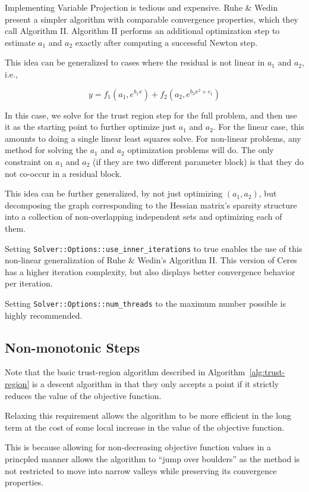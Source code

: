Implementing Variable Projection is tedious and expensive. Ruhe \&
Wedin present a simpler algorithm with comparable convergence
properties, which they call Algorithm II.  Algorithm II performs an
additional optimization step to estimate $a_1$ and $a_2$ exactly after
computing a successful Newton step.


This idea can be generalized to cases where the residual is not
linear in $a_1$ and $a_2$, i.e.,

\begin{equation}
  y = f_1(a_1, e^{b_1 x}) + f_2(a_2, e^{b_3 x^2 + c_1})
\end{equation}

In this case, we solve for the trust region step for the full problem,
and then use it as the starting point to further optimize just $a_1$
and $a_2$. For the linear case, this amounts to doing a single linear
least squares solve. For non-linear problems, any method for solving
the $a_1$ and $a_2$ optimization problems will do. The only constraint
on $a_1$ and $a_2$ (if they are two different parameter block) is that
they do not co-occur in a residual block.

This idea can be further generalized, by not just optimizing $(a_1,
a_2)$, but decomposing the graph corresponding to the Hessian matrix's
sparsity structure into a collection of non-overlapping independent sets
and optimizing each of them.

Setting \texttt{Solver::Options::use\_inner\_iterations} to true
enables
the use of this non-linear generalization of Ruhe \& Wedin's Algorithm
II.  This version of Ceres has a higher iteration complexity, but also
displays better convergence behavior per iteration.

Setting \texttt{Solver::Options::num\_threads} to the maximum number
possible is highly recommended.

\subsection{Non-monotonic Steps}
\label{sec:non-monotonic}
Note that the basic trust-region algorithm described in
Algorithm~\ref{alg:trust-region} is a descent algorithm  in that they
only accepts a point if it strictly reduces the value of the objective
function.

Relaxing this requirement allows the algorithm to be more
efficient in the long term at the cost of some local increase
in the value of the objective function.

This is because allowing for non-decreasing objective function
values in a princpled manner allows the algorithm to ``jump over
boulders'' as the method is not restricted to move into narrow
valleys while preserving its convergence properties.

